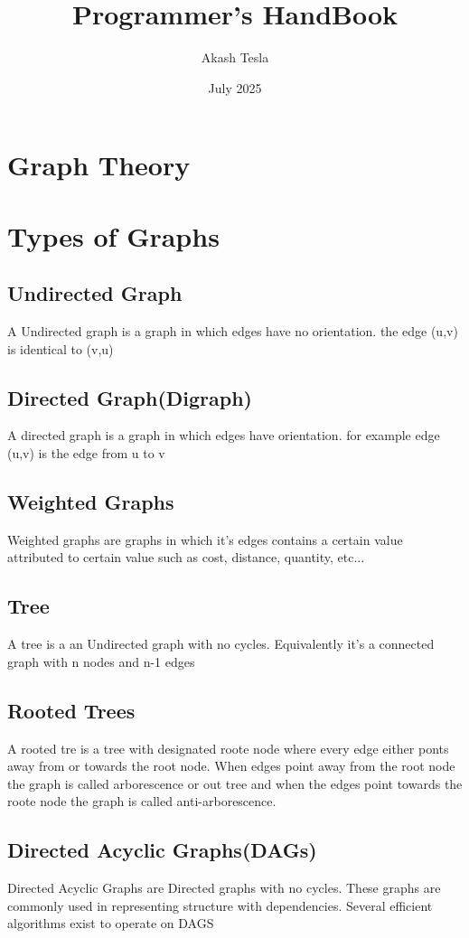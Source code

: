 \documentclass[12pt]{extarticle}
\title{Programmer's HandBook}
\author{Akash Tesla}
\date{July 2025}
\begin{document}
\tableofcontents
\newpage
\maketitle

\section*{Graph Theory}
\section{Types of Graphs}
\subsection{Undirected Graph}
A Undirected graph is a graph in which edges have no orientation. the edge (u,v) is identical
to (v,u)

\subsection{Directed Graph(Digraph)}
A directed graph is a graph in which edges have orientation. for example edge (u,v) is the edge
from u to v

\subsection{Weighted Graphs}
Weighted graphs are graphs in which it's edges contains a certain value attributed to certain
value such as cost, distance, quantity, etc... 

\subsection{Tree}
A tree is a an Undirected graph with no cycles. Equivalently it's a connected graph with 
n nodes and n-1 edges

\subsection{Rooted Trees}
A rooted tre is a tree with designated roote node where every edge either ponts away from
or towards the root node. When edges point away from the root node the graph is called 
arborescence or out tree and when the edges point towards the roote node the graph is called
anti-arborescence. 

\subsection{Directed Acyclic Graphs(DAGs)}
Directed Acyclic Graphs are Directed graphs with no cycles. These graphs are commonly used 
in representing structure with dependencies. Several efficient algorithms exist to operate
on DAGS
\end{document}
